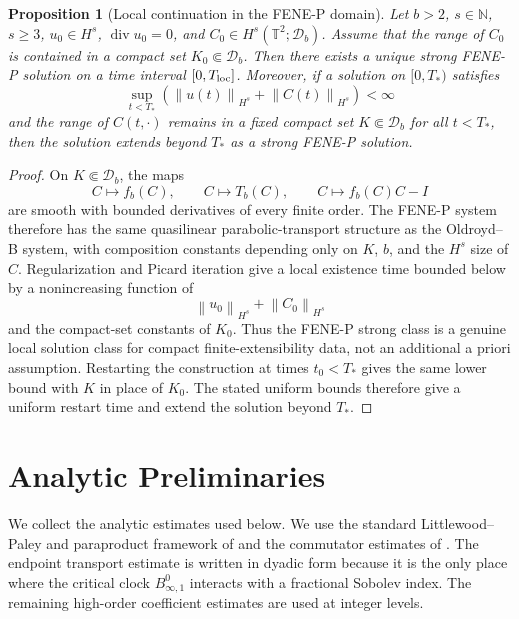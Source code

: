 \documentclass[11pt]{article}
\newtheorem{proposition}{Proposition}[section]
\newcommand{\T}{\mathbb T}
\newcommand{\Id}{I}
\newcommand{\divv}{\operatorname{div}}
\newcommand{\calD}{\mathcal D}
\newcommand{\norm}[1]{\left\lVert #1\right\rVert}
\begin{document}
\begin{proposition}[Local continuation in the FENE-P domain]
\label{prop:fene-local-continuation}
Let \(b>2\), \(s\in\mathbb N\), \(s\ge3\), \(u_0\in H^s\), \(\divv u_0=0\), and
\(C_0\in H^s(\T^2;\calD_b)\).  Assume that the range of \(C_0\) is contained
in a compact set \(K_0\Subset\calD_b\).  Then there exists a unique strong
FENE-P solution on a time interval \([0,T_{\rm loc}]\).  Moreover, if a
solution on \([0,T_*)\) satisfies
\[
  \sup_{t<T_*}\left(
  \norm{u(t)}_{H^s}+\norm{C(t)}_{H^s}
  \right)<\infty
\]
and the range of \(C(t,\cdot)\) remains in a fixed compact set
\(K\Subset\calD_b\) for all \(t<T_*\), then the solution extends beyond
\(T_*\) as a strong FENE-P solution.
\end{proposition}

\begin{proof}
On \(K\Subset\calD_b\), the maps
\[
  C\mapsto f_b(C),\qquad C\mapsto T_b(C),\qquad
  C\mapsto f_b(C)C-\Id
\]
are smooth with bounded derivatives of every finite order.  The FENE-P system
therefore has the same quasilinear parabolic-transport structure as the
Oldroyd--B system, with composition constants depending only on \(K\), \(b\),
and the \(H^s\) size of \(C\).  Regularization and Picard iteration give a
local existence time bounded below by a nonincreasing function of
\[
  \norm{u_0}_{H^s}+\norm{C_0}_{H^s}
\]
and the compact-set constants of \(K_0\).  Thus the FENE-P strong class is
a genuine local solution class for compact finite-extensibility data, not an
additional a priori assumption.  Restarting the construction at
times \(t_0<T_*\) gives the same lower bound with \(K\) in place of \(K_0\).
The stated uniform bounds therefore give a uniform restart time and extend the
solution beyond \(T_*\).
\end{proof}

\section{Analytic Preliminaries}
\label{sec:preliminaries}

We collect the analytic estimates used below.  We use the standard
Littlewood--Paley and paraproduct framework of
\cite{BahouriCheminDanchin2011} and the commutator estimates of
\cite{KatoPonce1988}.  The endpoint transport estimate is written in dyadic form
because it is the only place where the critical clock \(B^0_{\infty,1}\)
interacts with a fractional Sobolev index.
The remaining high-order coefficient estimates are used at integer levels.
\end{document}
